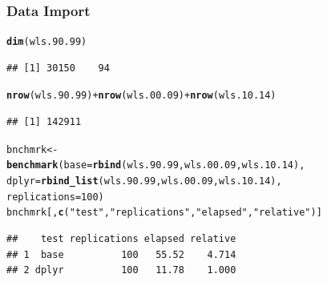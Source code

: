 \documentclass{beamer}\usepackage[]{graphicx}\usepackage[]{color}
\makeatletter
\newcommand{\hlnum}[1]{\textcolor[rgb]{0.686,0.059,0.569}{#1}}%
\newcommand{\hlstr}[1]{\textcolor[rgb]{0.192,0.494,0.8}{#1}}%
\newcommand{\hlopt}[1]{\textcolor[rgb]{0,0,0}{#1}}%
\newcommand{\hlstd}[1]{\textcolor[rgb]{0.345,0.345,0.345}{#1}}%
\newcommand{\hlkwb}[1]{\textcolor[rgb]{0.69,0.353,0.396}{#1}}%
\newcommand{\hlkwc}[1]{\textcolor[rgb]{0.333,0.667,0.333}{#1}}%
\newcommand{\hlkwd}[1]{\textcolor[rgb]{0.737,0.353,0.396}{\textbf{#1}}}%
\newenvironment{kframe}{%
 \def\at@end@of@kframe{}%
 \ifinner\ifhmode%
  \def\at@end@of@kframe{\end{minipage}}%
  \begin{minipage}{\columnwidth}%
 \fi\fi%
 \def\FrameCommand##1{\hskip\@totalleftmargin \hskip-\fboxsep
 \colorbox{shadecolor}{##1}\hskip-\fboxsep
     \hskip-\linewidth \hskip-\@totalleftmargin \hskip\columnwidth}%
 \MakeFramed {\advance\hsize-\width
   \@totalleftmargin\z@ \linewidth\hsize
   \@setminipage}}%
 {\par\unskip\endMakeFramed%
 \at@end@of@kframe}
\newenvironment{knitrout}{}{} %
\makeatother
\begin{document}
\begin{frame}[fragile]
  \frametitle{Data Import}
\begin{knitrout}\footnotesize
{}\color{fgcolor}\begin{kframe}
\begin{alltt}
\hlkwd{dim}\hlstd{(wls.90.99)}
\end{alltt}
\begin{verbatim}
## [1] 30150    94
\end{verbatim}
\begin{alltt}
\hlkwd{nrow}\hlstd{(wls.90.99)} \hlopt{+} \hlkwd{nrow}\hlstd{(wls.00.09)} \hlopt{+} \hlkwd{nrow}\hlstd{(wls.10.14)}
\end{alltt}
\begin{verbatim}
## [1] 142911
\end{verbatim}
\begin{alltt}
\hlstd{bnchmrk} \hlkwb{<-}
  \hlkwd{benchmark}\hlstd{(}\hlkwc{base}  \hlstd{=} \hlkwd{rbind}\hlstd{(wls.90.99, wls.00.09, wls.10.14),}
            \hlkwc{dplyr} \hlstd{=} \hlkwd{rbind_list}\hlstd{(wls.90.99, wls.00.09, wls.10.14),}
            \hlkwc{replications} \hlstd{=} \hlnum{100}\hlstd{)}
\hlstd{bnchmrk[,} \hlkwd{c}\hlstd{(}\hlstr{"test"}\hlstd{,} \hlstr{"replications"}\hlstd{,} \hlstr{"elapsed"}\hlstd{,} \hlstr{"relative"}\hlstd{)]}
\end{alltt}
\begin{verbatim}
##    test replications elapsed relative
## 1  base          100   55.52    4.714
## 2 dplyr          100   11.78    1.000
\end{verbatim}
\end{kframe}
\end{knitrout}
\end{frame} 
\end{document}
